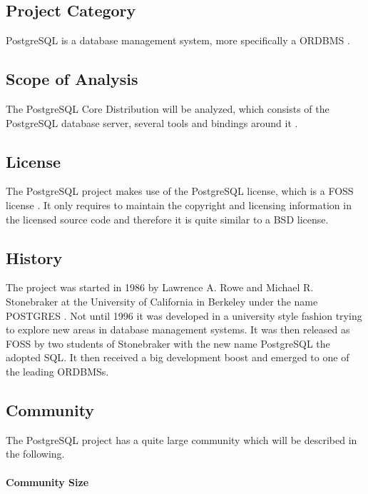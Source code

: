 \subsection{Project Category}

PostgreSQL is a database management system, more specifically a \ac{ORDBMS}
\cite{PostgreSQLAbout}.

\subsection{Scope of Analysis}

The PostgreSQL Core Distribution will be analyzed, which consists of the
PostgreSQL database server, several tools and bindings around it
\cite{PostgreSQLDownload}.

\subsection{License}

The PostgreSQL project makes use of the PostgreSQL license, which is a
\ac{FOSS} license \cite{PostgreSQLFAQ,PostgreSQLLicense}. It only requires to
maintain the copyright and licensing information in the licensed source code
and therefore it is quite similar to a BSD license.

\subsection{History}

The project was started in 1986 by Lawrence A. Rowe and Michael R. Stonebraker
at the University of California in Berkeley under the name POSTGRES
\cite{PostgreSQLHistory}. Not until 1996 it was developed in a university style
fashion trying to explore new areas in database management systems. It was then
released as \ac{FOSS} by two students of Stonebraker with the new name
PostgreSQL the adopted \ac{SQL}. It then received a big development boost and
emerged to one of the leading \acp{ORDBMS}.

\subsection{Community}

The PostgreSQL project has a quite large community which will be described in
the following.

\paragraph{Community Size}

